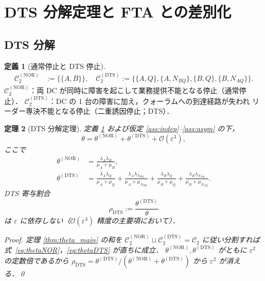 \documentclass[12pt,a4paper]{article}
\theoremstyle{plain}
\newtheorem{theorem}{定理}[section]
\theoremstyle{definition}
\newtheorem{definition}[theorem]{定義}
\theoremstyle{remark}
\newcommand{\calO}{\mathcal{O}}
\newcommand{\eps}{\varepsilon}
\newcommand{\calCtwo}{\mathcal{C}_2}
\newcommand{\calCNOR}{\calCtwo^{(\mathrm{NOR})}}
\newcommand{\calCDTS}{\calCtwo^{(\mathrm{DTS})}}
\newcommand{\thetaNOR}{\theta^{(\mathrm{NOR})}}
\newcommand{\thetaDTS}{\theta^{(\mathrm{DTS})}}
\newcommand{\rhoDTS}{\rho_{\mathrm{DTS}}}
\begin{document}
\section{DTS 分解定理と FTA との差別化}\label{sec:DTS}

\subsection{DTS 分解}

\begin{definition}[通常停止と DTS 停止]\label{def:DTS}
  \begin{align}
    \calCNOR &:= \bigl\{\{A,B\}\bigr\},\quad
    \calCDTS := \bigl\{\{A,Q\},\{A,N_{BQ}\},\{B,Q\},\{B,N_{AQ}\}\bigr\}.
  \end{align}
  $\calCNOR$：両 DC が同時に障害を起こして業務提供不能となる停止（通常停止）．
  $\calCDTS$：DC の 1 台の障害に加え，クォーラムへの到達経路が失われ
  リーダー専決不能となる停止（二重誘因停止；DTS）．
\end{definition}

\begin{theorem}[DTS 分解定理]\label{thm:DTS}
  定義 \ref{def:DTS} および仮定 \ref{ass:indep}--\ref{ass:asym} の下，
  \begin{equation}\label{eq:theta_decomp}
    \theta = \thetaNOR + \thetaDTS + \calO(\eps^3),
  \end{equation}
  ここで
  \begin{align}
    \thetaNOR &= \frac{\lambda_A\lambda_B}{\mu_A+\mu_B},
    \label{eq:thetaNOR}\\
    \thetaDTS &= \frac{\lambda_A\lambda_Q}{\mu_A+\mu_Q}
               + \frac{\lambda_A\lambda_{N_{BQ}}}{\mu_A+\mu_{N_{BQ}}}
               + \frac{\lambda_B\lambda_Q}{\mu_B+\mu_Q}
               + \frac{\lambda_B\lambda_{N_{AQ}}}{\mu_B+\mu_{N_{AQ}}}.
    \label{eq:thetaDTS}
  \end{align}
  DTS 寄与割合
  \begin{equation}\label{eq:rhoDTS}
    \rhoDTS := \frac{\thetaDTS}{\theta}
  \end{equation}
  は $\eps$ に依存しない（$\calO(\eps^3)$ 精度の主要項において）．

  \begin{proof}
    定理 \ref{thm:theta_main} の和を $\calCNOR\sqcup\calCDTS=\calCtwo$ に従い分割すれば
    式~\eqref{eq:thetaNOR}，\eqref{eq:thetaDTS} が直ちに成立．
    $\thetaNOR, \thetaDTS$ がともに $\eps^2$ の定数倍であるから
    $\rhoDTS = \thetaDTS/(\thetaNOR+\thetaDTS)$ から $\eps^2$ が消える．\qed
  \end{proof}
\end{theorem}
\end{document}
